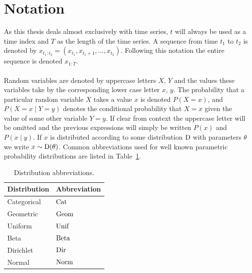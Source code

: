 \documentclass[12pt]{report}
\newcommand{\1}[0]{\mathbbm{1}}
\newcommand{\Beta}[0]{\textnormal{Beta}}
\newcommand{\Unif}[0]{\textnormal{Unif}}
\newcommand{\Cat}[0]{\textnormal{Cat}}
\newcommand{\Dir}[0]{\textnormal{Dir}}
\newcommand{\Norm}[0]{\textnormal{Norm}}
\newcommand{\SomeDist}[0]{\textnormal{D}}
\newcommand{\Geom}[0]{\textnormal{Geom}}
\newcommand{\seq}[3]{\ensuremath{#1_{{#2}:{#3}}}}
\begin{document}
\chapter*{Notation}
As this thesis deals almost exclusively with time series, $t$ will always
be used as a time index and $T$ as the length of the time series.
A sequence from time $t_1$ to $t_2$ is denoted by
$\seq{x}{t_1}{t_2} = (x_{t_1}, x_{t_1 + 1}, \ldots, x_{t_2})$.
Following this notation the entire sequence is denoted $\seq{x}{1}{T}$.
\\\\
Random variables are denoted by uppercase letters $X$, $Y$
and the values these variables take by the corresponding lower case
letter $x$, $y$. The probability that a particular random variable $X$
takes a value $x$ is denoted $P(X=x)$, and $P(X=x \mid Y=y)$ denotes
the conditional probability that $X=x$ given the value of some other variable $Y=y$.
If clear from context the uppercase letter will be omitted and the previous expressions
will simply be written $P(x)$ and $P(x \mid y)$. If $x$ is distributed according to some
distribution $\SomeDist$ with parameters $\theta$ we write $x \sim \SomeDist(\theta)$.
Common abbreviations used for well known parametric probability distributions are listed
in Table~\ref{table:distributions}.
\begin{table}[ht]
    \centering
    \begin{tabular}{l l}\hline
    \textbf{Distribution} & \textbf{Abbreviation}\\\hline
    Categorical & $\Cat$ \\
    Geometric & $\Geom$ \\
    Uniform & $\Unif$ \\
    Beta & $\Beta$ \\
    Dirichlet & $\Dir$ \\
    Normal & $\Norm$ \\
    \end{tabular}
    \caption[Distributions]{Distribution abbreviations.}
    \label{table:distributions}
\end{table}
\end{document}
